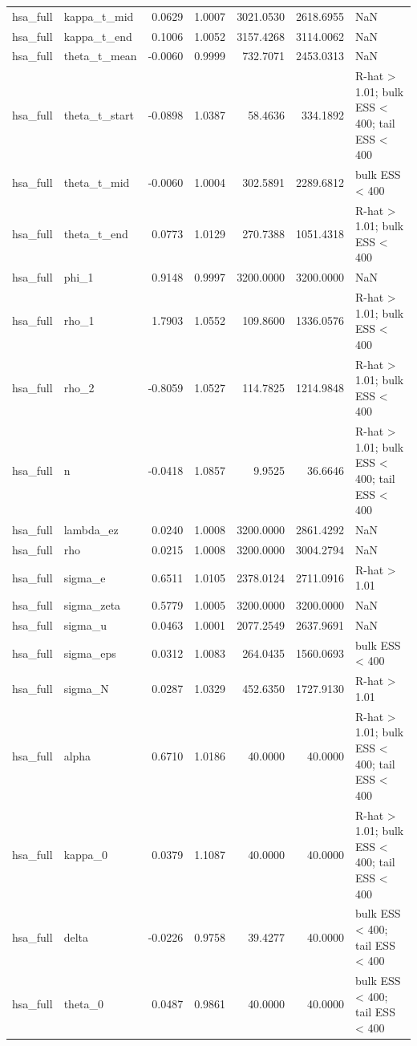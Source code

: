 \begin{tabular}{llrrrrl}
hsa\_full & kappa\_t\_mid & 0.0629 & 1.0007 & 3021.0530 & 2618.6955 & NaN \\
hsa\_full & kappa\_t\_end & 0.1006 & 1.0052 & 3157.4268 & 3114.0062 & NaN \\
hsa\_full & theta\_t\_mean & -0.0060 & 0.9999 & 732.7071 & 2453.0313 & NaN \\
hsa\_full & theta\_t\_start & -0.0898 & 1.0387 & 58.4636 & 334.1892 & R-hat > 1.01; bulk ESS < 400; tail ESS < 400 \\
hsa\_full & theta\_t\_mid & -0.0060 & 1.0004 & 302.5891 & 2289.6812 & bulk ESS < 400 \\
hsa\_full & theta\_t\_end & 0.0773 & 1.0129 & 270.7388 & 1051.4318 & R-hat > 1.01; bulk ESS < 400 \\
hsa\_full & phi\_1 & 0.9148 & 0.9997 & 3200.0000 & 3200.0000 & NaN \\
hsa\_full & rho\_1 & 1.7903 & 1.0552 & 109.8600 & 1336.0576 & R-hat > 1.01; bulk ESS < 400 \\
hsa\_full & rho\_2 & -0.8059 & 1.0527 & 114.7825 & 1214.9848 & R-hat > 1.01; bulk ESS < 400 \\
hsa\_full & n & -0.0418 & 1.0857 & 9.9525 & 36.6646 & R-hat > 1.01; bulk ESS < 400; tail ESS < 400 \\
hsa\_full & lambda\_ez & 0.0240 & 1.0008 & 3200.0000 & 2861.4292 & NaN \\
hsa\_full & rho & 0.0215 & 1.0008 & 3200.0000 & 3004.2794 & NaN \\
hsa\_full & sigma\_e & 0.6511 & 1.0105 & 2378.0124 & 2711.0916 & R-hat > 1.01 \\
hsa\_full & sigma\_zeta & 0.5779 & 1.0005 & 3200.0000 & 3200.0000 & NaN \\
hsa\_full & sigma\_u & 0.0463 & 1.0001 & 2077.2549 & 2637.9691 & NaN \\
hsa\_full & sigma\_eps & 0.0312 & 1.0083 & 264.0435 & 1560.0693 & bulk ESS < 400 \\
hsa\_full & sigma\_N & 0.0287 & 1.0329 & 452.6350 & 1727.9130 & R-hat > 1.01 \\
hsa\_full & alpha & 0.6710 & 1.0186 & 40.0000 & 40.0000 & R-hat > 1.01; bulk ESS < 400; tail ESS < 400 \\
hsa\_full & kappa\_0 & 0.0379 & 1.1087 & 40.0000 & 40.0000 & R-hat > 1.01; bulk ESS < 400; tail ESS < 400 \\
hsa\_full & delta & -0.0226 & 0.9758 & 39.4277 & 40.0000 & bulk ESS < 400; tail ESS < 400 \\
hsa\_full & theta\_0 & 0.0487 & 0.9861 & 40.0000 & 40.0000 & bulk ESS < 400; tail ESS < 400 \\

\end{tabular}
